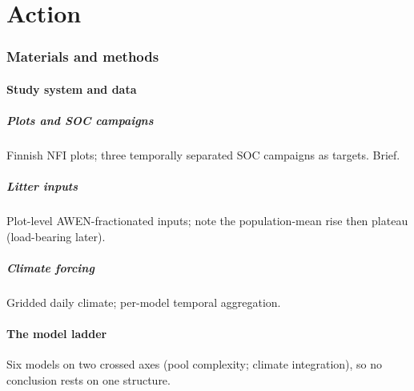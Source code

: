 \documentclass[11pt]{article}
\begin{document}
\part{Action}

\section{Materials and methods}

\subsection{Study system and data}

\subsubsection{Plots and SOC campaigns}
Finnish NFI plots; three temporally separated SOC campaigns as targets.
Brief.

\subsubsection{Litter inputs}
Plot-level AWEN-fractionated inputs; note the population-mean rise then
plateau (load-bearing later).

\subsubsection{Climate forcing}
Gridded daily climate; per-model temporal aggregation.

\subsection{The model ladder}
Six models on two crossed axes (pool complexity; climate integration), so no
conclusion rests on one structure.
\end{document}
